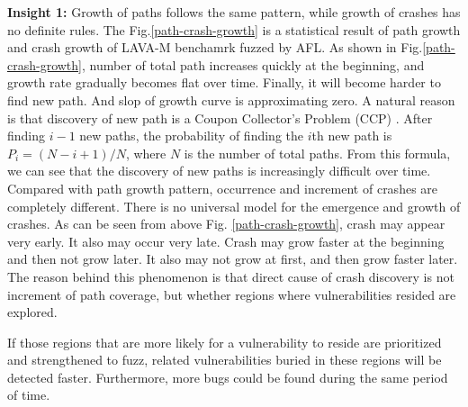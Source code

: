 \textbf{Insight 1: } Growth of paths follows the same pattern, while growth of crashes has no definite rules. The Fig.\ref{path-crash-growth} is a statistical result of path growth and crash growth of LAVA-M \cite{lava} benchamrk fuzzed by AFL. As shown in Fig.\ref{path-crash-growth}, number of total path increases quickly at the beginning, and growth rate gradually becomes flat over time. Finally, it will become harder to find new path. And slop of growth curve is approximating zero. A natural reason is that discovery of new path is a Coupon Collector’s Problem (CCP) \cite{ferrante2014coupon}. After finding $i-1$ new paths, the probability of finding the $i$th new path is $P_{i}= (N-i+1)/N$, where $N$ is the number of total paths. From this formula, we can see that the discovery of new paths is increasingly difficult over time. Compared with path growth pattern, occurrence and increment of crashes are completely different. There is no universal model for the emergence and growth of crashes. As can be seen from above Fig. \ref{path-crash-growth}, crash may appear very early. It also may occur very late. Crash may grow faster at the beginning and then not grow later. It also may not grow at first, and then grow faster later. The reason behind this phenomenon is that direct cause of crash discovery is not increment of path coverage, but whether regions where vulnerabilities resided are explored. 

%
%     
%       

If those regions that are more likely for a vulnerability to reside are prioritized and strengthened to fuzz, related vulnerabilities buried in these regions will be detected faster. Furthermore, more bugs could be found during the same period of time. 

